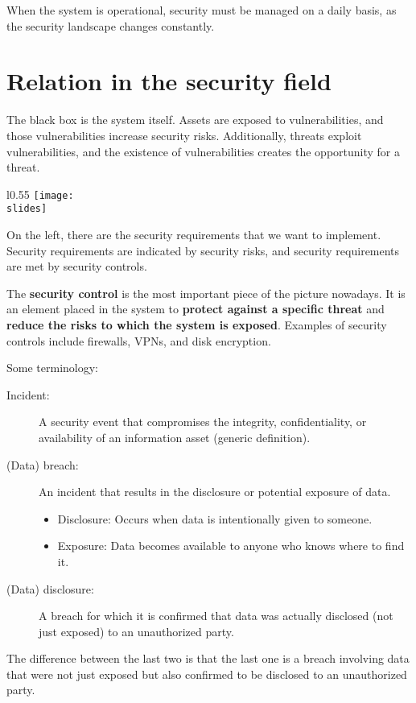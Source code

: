 When the system is operational, security must be managed on a daily basis, as the security landscape changes constantly.


\section{Relation in the security field}

The black box is the system itself.
Assets are exposed to vulnerabilities, and those vulnerabilities increase security risks.
Additionally, threats exploit vulnerabilities, and the existence of vulnerabilities creates the opportunity for a threat.
\begin{wrapfigure}{l}{0.55\textwidth}
  \centering
  \texttt{[image: \\slides]}
\end{wrapfigure}
On the left, there are the security requirements that we want to implement. Security requirements are indicated by security risks, and security requirements are met by security controls.

The \textbf{security control} is the most important piece of the picture nowadays. It is an element placed in the system to \textbf{protect against a specific threat} and \textbf{reduce the risks to which the system is exposed}. Examples of security controls include firewalls, VPNs, and disk encryption.

\bigskip
Some terminology:
\begin{description}
  \item[Incident:] A security event that compromises the integrity, confidentiality, or availability of an information asset (generic definition).
  \item[(Data) breach:] An incident that results in the disclosure or potential exposure of data.
    \begin{itemize}
      \item Disclosure: Occurs when data is intentionally given to someone.
      \item Exposure: Data becomes available to anyone who knows where to find it.
    \end{itemize}
  \item[(Data) disclosure:] A breach for which it is confirmed that data was actually disclosed (not just exposed) to an unauthorized party.
\end{description}
The difference between the last two is that the last one is a breach involving data that were not just exposed but also confirmed to be disclosed to an unauthorized party.


